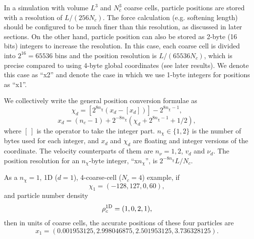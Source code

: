\documentclass[10pt,twocolumn,preprint]{emulateapj}
\begin{document}
In a simulation with volume $L^3$ and $N_c^3$ coarse cells, particle positions are stored with a resolution of $L/(256N_c)$. The force calculation (e.g. softening length) should be configured to be much finer than this resolution, as discussed in later sections. On the other hand, particle position can also be stored as 2-byte (16 bits) integers to increase the resolution. In this case, each coarse cell is divided into $2^{16}=65536$ bins and the position resolution is $L/(65536N_c)$, which is precise compared to using 4-byte global coordinates (see later results). We denote this case as ``x2'' and denote the case in which we use 1-byte integers for positions as ``x1''.

We collectively write the general position conversion formulae as
\begin{equation}\label{eq.chi}
	\chi_d=\left[2^{8n_\chi}(x_d-\left[x_d\right])\right]-2^{8n_\chi-1},
\end{equation}
\begin{equation}\label{eq.x}
	x_d=(n_c-1)+2^{-8n_\chi}\left(\chi_d+2^{8n_\chi-1}+1/2\right),
\end{equation}
where $[\ ]$ is the operator to take the integer part. $n_\chi\in\{1,2\}$ is the number of bytes used for each integer, and $x_d$ and $\chi_d$ are floating and integer versions of the coordinate. The velocity counterparts of them are $n_\nu=1,2$, $v_d$ and $\nu_d$.
The position resolution for an $n_\chi$-byte integer, ``x$n_\chi$'', is $2^{-8n_\chi}L/N_c$.

As a $n_\chi=1$, 1D ($d=1$), 4-coarse-cell ($N_c=4$) example, if $$\chi_1=(-128,127,0,60),$$ and particle number density $${\rho_c^{\rm 1D}}=(1,0,2,1),$$ then in units of coarse cells, the accurate positions of these four particles are $$x_1=(0.001953125, 2.998046875, 2.501953125, 3.736328125).$$
\end{document}
